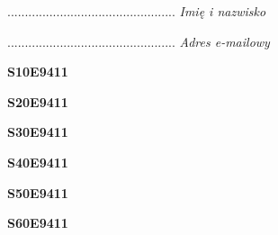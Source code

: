 \begin{turn}{90}\begin{minipage}{\linewidth} \vspace{20mm} ................................................  \textit{Imię i nazwisko}\end{minipage}\end{turn}

\begin{turn}{90}\begin{minipage}{\linewidth} \vspace{20mm} ................................................  \textit{Adres e-mailowy}\end{minipage}\end{turn}

\begin{turn}{90}\huge \begin{minipage}{\linewidth} \vspace{10mm}\textbf{S10E9411}\end{minipage}\end{turn}

\begin{turn}{90}\huge \begin{minipage}{\linewidth} \vspace{10mm}\textbf{S20E9411}\end{minipage}\end{turn}

\begin{turn}{90}\huge \begin{minipage}{\linewidth} \vspace{10mm}\textbf{S30E9411}\end{minipage}\end{turn}

\begin{turn}{90}\huge \begin{minipage}{\linewidth} \vspace{10mm}\textbf{S40E9411}\end{minipage}\end{turn}

\begin{turn}{90}\huge \begin{minipage}{\linewidth} \vspace{10mm}\textbf{S50E9411}\end{minipage}\end{turn}

\begin{turn}{90}\huge \begin{minipage}{\linewidth} \vspace{10mm}\textbf{S60E9411}\end{minipage}\end{turn}

